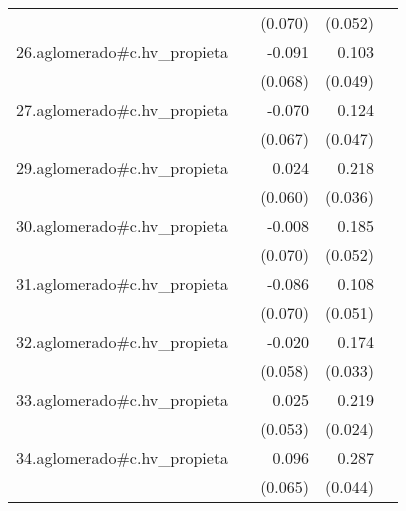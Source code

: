 {\begin{longtable}{l*{4}{D{.}{.}{-1}}}
            &                     &     (0.070)         &     (0.052)         &                     \\
\addlinespace
26.aglomerado#c.hv\_propieta&                     &      -0.091         &       0.103\sym{*}  &                     \\
            &                     &     (0.068)         &     (0.049)         &                     \\
\addlinespace
27.aglomerado#c.hv\_propieta&                     &      -0.070         &       0.124\sym{**} &                     \\
            &                     &     (0.067)         &     (0.047)         &                     \\
\addlinespace
29.aglomerado#c.hv\_propieta&                     &       0.024         &       0.218\sym{***}&                     \\
            &                     &     (0.060)         &     (0.036)         &                     \\
\addlinespace
30.aglomerado#c.hv\_propieta&                     &      -0.008         &       0.185\sym{***}&                     \\
            &                     &     (0.070)         &     (0.052)         &                     \\
\addlinespace
31.aglomerado#c.hv\_propieta&                     &      -0.086         &       0.108\sym{*}  &                     \\
            &                     &     (0.070)         &     (0.051)         &                     \\
\addlinespace
32.aglomerado#c.hv\_propieta&                     &      -0.020         &       0.174\sym{***}&                     \\
            &                     &     (0.058)         &     (0.033)         &                     \\
\addlinespace
33.aglomerado#c.hv\_propieta&                     &       0.025         &       0.219\sym{***}&                     \\
            &                     &     (0.053)         &     (0.024)         &                     \\
\addlinespace
34.aglomerado#c.hv\_propieta&                     &       0.096         &       0.287\sym{***}&                     \\
            &                     &     (0.065)         &     (0.044)         &                     \\

\end{longtable}}
